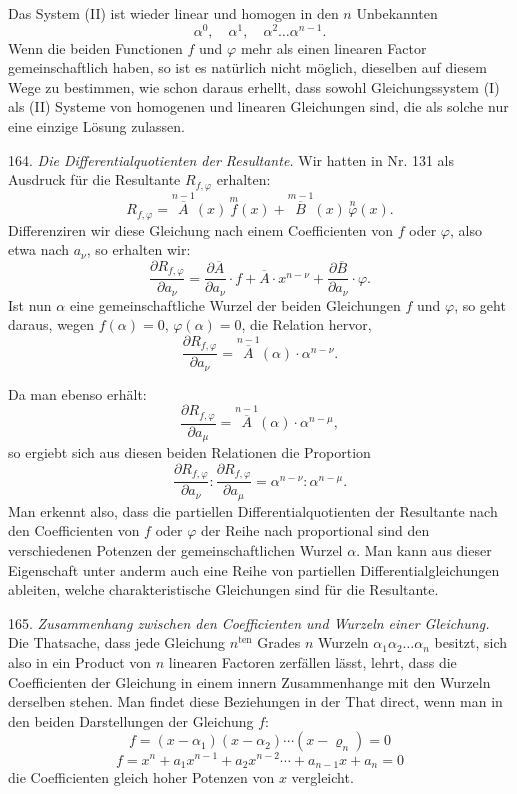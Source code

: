 \documentclass[11pt]{article}
\providecommand{\weberpage}[1]{}
\providecommand{\weq}[2]{\begin{equation}\tag{#1}#2\end{equation}}
\begin{document}
Das System (II) ist wieder linear und homogen in den $n$ Unbekannten
\[
\alpha^0, \quad \alpha^1, \quad \alpha^2 \ldots \alpha^{n-1}.
\]
Wenn die beiden Functionen $f$ und $\varphi$ mehr als einen linearen Factor gemeinschaftlich haben, so ist es natürlich nicht möglich, dieselben auf diesem Wege zu bestimmen, wie schon daraus erhellt, dass sowohl Gleichungssystem (I) als (II) Systeme von homogenen und linearen Gleichungen sind, die als solche nur eine einzige Lösung zulassen.

164. \textit{Die Differentialquotienten der Resultante.} Wir hatten in Nr. 131 als Ausdruck für die Resultante $R_{f,\varphi}$ erhalten:
\[
R_{f,\varphi} = \overset{n-1}{\overline{A}}(x)\,\overset{m}{f}(x) + \overset{m-1}{\overline{B}}(x)\,\overset{n}{\varphi}(x).
\]
Differenziren wir diese Gleichung nach einem Coefficienten von $f$ oder $\varphi$, also etwa nach $a_\nu$, so erhalten wir:
\[
\frac{\partial R_{f,\varphi}}{\partial a_\nu} = \frac{\partial \overline{A}}{\partial a_\nu}\cdot f + \overline{A}\cdot x^{n-\nu} + \frac{\partial \overline{B}}{\partial a_\nu}\cdot \varphi.
\]
Ist nun $\alpha$ eine gemeinschaftliche Wurzel der beiden Gleichungen $f$ und $\varphi$, so geht daraus, wegen $f(\alpha)=0$, $\varphi(\alpha)=0$, die Relation hervor,
\weq{1}{
\frac{\partial R_{f,\varphi}}{\partial a_\nu} = \overset{n-1}{\overline{A}}(\alpha)\cdot \alpha^{n-\nu}.
}


\weberpage{176}
Da man ebenso erhält:
\weq{2}{
\frac{\partial R_{f,\varphi}}{\partial a_\mu} = \overset{n-1}{\overline{A}}(\alpha)\cdot \alpha^{n-\mu},
}
so ergiebt sich aus diesen beiden Relationen die Proportion
\[
\frac{\partial R_{f,\varphi}}{\partial a_\nu} : \frac{\partial R_{f,\varphi}}{\partial a_\mu} = \alpha^{n-\nu} : \alpha^{n-\mu}.
\]
Man erkennt also, dass die partiellen Differentialquotienten der Resultante nach den Coefficienten von $f$ oder $\varphi$ der Reihe nach proportional sind den verschiedenen Potenzen der gemeinschaftlichen Wurzel $\alpha$. Man kann aus dieser Eigenschaft unter anderm auch eine Reihe von partiellen Differentialgleichungen ableiten, welche charakteristische Gleichungen sind für die Resultante.

165. \textit{Zusammenhang zwischen den Coefficienten und Wurzeln einer Gleichung.} Die Thatsache, dass jede Gleichung $n^{\mathrm{ten}}$ Grades $n$ Wurzeln $\alpha_1 \alpha_2 \ldots \alpha_n$ besitzt, sich also in ein Product von $n$ linearen Factoren zerfällen lässt, lehrt, dass die Coefficienten der Gleichung in einem innern Zusammenhange mit den Wurzeln derselben stehen. Man findet diese Beziehungen in der That direct, wenn man in den beiden Darstellungen der Gleichung $f$:
\[
f = (x-\alpha_1)(x-\alpha_2)\cdots(x-\varrho_n) = 0 %
\]
\[
f = x^n + a_1 x^{n-1} + a_2 x^{n-2} \cdots + a_{n-1}x + a_n = 0
\]
die Coefficienten gleich hoher Potenzen von $x$ vergleicht.
\end{document}
